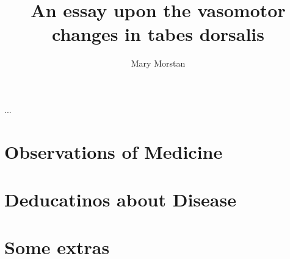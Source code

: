 \documentclass[jdecimal, citestyle=apa, 11pt]{maine-thesis}  %
\title{An essay upon the vasomotor changes in tabes dorsalis} %
\author{Mary Morstan} %
\begin{document}
\preliminary
\maketitle

\begin{abstract}
\Blindtext
\end{abstract}

\begin{layabstract}{...} %
\blindtext
\end{layabstract}

\tableofcontents

\mainmatter

\chapter{Observations of Medicine}
\blindtext

\chapter{Deducatinos about Disease}
\blindtext

\appendix %
\chapter{Some extras}
\blindtext
\end{document}
